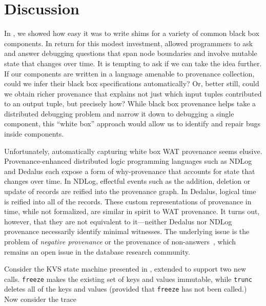 \section{Discussion}

In , we showed how easy it was to write shims 
for a variety of common black box components.  In return for this modest 
investment, \fluent{}  allowed programmers to ask and answer debugging questions 
that span node boundaries and involve mutable state that changes over time. 
It is tempting to ask if we can take the idea further.  If our components are 
written in a language amenable to provenance collection, could we infer their 
black box specifications automatically?  Or, better still, could we obtain 
richer provenance that explains not just which input tuples contributed to 
an output tuple, but precisely how?  While black box provenance helps take 
a distributed debugging problem and narrow it down to debugging a single 
component, this ``white box'' approach would allow us to identify and repair 
bugs inside components.

Unfortunately, automatically capturing white box WAT provenance seems elusive.
Provenance-enhanced distributed logic programming languages such as NDLog and
Dedalus each expose a form of why-provenance that accounts for state that
changes over time.  In NDLog, effectful events such as the addition, deletion or update of records are reified into the provenance graph.  In Dedalus, logical
time is reified into all of the records.  These custom representations of
provenance in time, while not formalized, are similar in spirit to WAT provenance.
It turns out, however, that they are not equivalent to it---neither Dedalus nor
NDLog provenance necessarily identify minimal witnesses.  The underlying issue
is the problem of \emph{negative provenance} or the provenance of
non-answers~\cite{chapman2009whynot,huang2008nonanswers}, which remains an open issue in
the database research community.

\newcommand{\kvset}{\text{set}}
\newcommand{\kvget}{\text{get}}
\newcommand{\freeze}{\text{freeze}}
\newcommand{\trunc}{\text{trunc}}

Consider the KVS state machine presented in , extended to support two new calls.   \texttt{freeze} makes the existing set of keys and values immutable, while \texttt{trunc} deletes all of the keys and values (provided that \texttt{freeze} has not been called.)  Now consider the trace 

